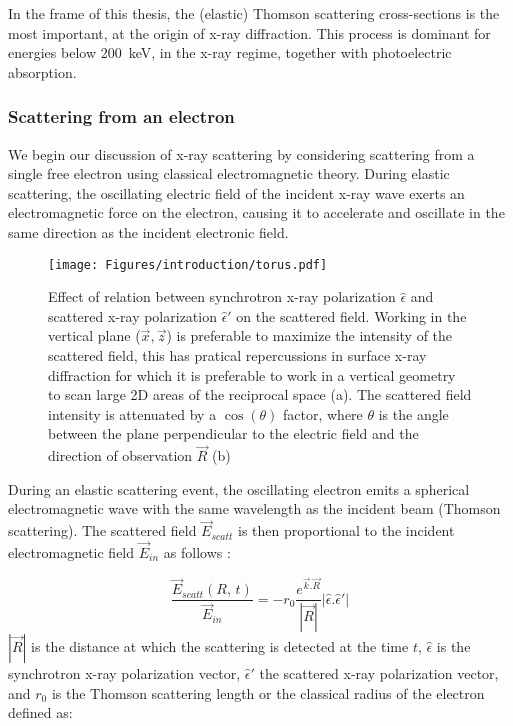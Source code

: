 In the frame of this thesis, the (elastic) Thomson scattering cross-sections is the most important, at the origin of x-ray diffraction.
This process is dominant for energies below \qty{200}{\keV}, in the x-ray regime,  together with photoelectric absorption.%

\subsubsection{Scattering from an electron}

We begin our discussion of x-ray scattering by considering scattering from a single free electron using classical electromagnetic theory.
During elastic scattering, the oscillating electric field of the incident x-ray wave exerts an electromagnetic force on the electron, causing it to accelerate and oscillate in the same direction as the incident electronic field.

\begin{figure}[!htb]
    \centering
    \texttt{[image: Figures/introduction/torus.pdf]}
    \caption{
        Effect of relation between synchrotron x-ray polarization $\hat{\epsilon}$ and scattered x-ray polarization $\hat{\epsilon}'$ on the scattered field.
        Working in the vertical plane ($\vec{x}, \vec{z}$) is preferable to maximize the intensity of the scattered field, this has pratical repercussions in surface x-ray diffraction for which it is preferable to work in a vertical geometry to scan large 2D areas of the reciprocal space (a).
        The scattered field intensity is attenuated by a $\cos{(\theta)}$ factor, where $\theta$ is the angle between the plane perpendicular to the electric field and the direction of observation $\vec{R}$ (b)
    }
    \label{fig:polarization_effect}
\end{figure}

During an elastic scattering event, the oscillating electron emits a spherical electromagnetic wave with the same wavelength as the incident beam (Thomson scattering).
The scattered field $\vec{E}_{scatt}$ is then proportional to the incident electromagnetic field $\vec{E}_{in}$ as follows \parencite{NielsenMcMorrow}:

\begin{equation}
    \label{eq:scatt_field}
    \frac{\vec{E}_{scatt}(R, \, t)} {\vec{E}_{in}} = -r_0 \frac{e^{\vec{k}.\vec{R}}} {|\vec{R}|}| \hat{\epsilon}.\hat{\epsilon}'|
\end{equation}
$|\vec{R}|$ is the distance at which the scattering is detected at the time $t$, $\hat{\epsilon}$ is the synchrotron x-ray polarization vector, $\hat{\epsilon}'$ the scattered x-ray polarization vector, and $r_0$ is the Thomson scattering length or the classical radius of the electron defined as:

